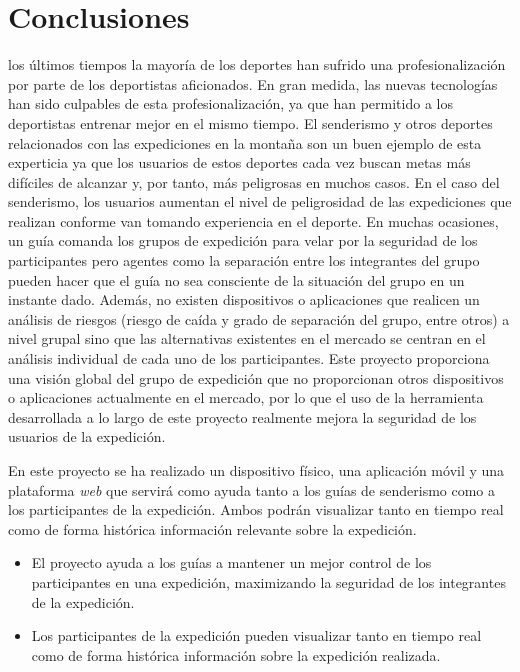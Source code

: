 \chapter{Conclusiones}
\label{chap:conclusiones}

 los últimos tiempos la mayoría de los deportes han sufrido una profesionalización por parte de los deportistas aficionados. En gran medida, las nuevas tecnologías han sido culpables de esta profesionalización, ya que han permitido a los deportistas entrenar mejor en el mismo tiempo. El senderismo y otros deportes relacionados con las expediciones en la montaña son un buen ejemplo de esta experticia ya que los usuarios de estos deportes cada vez buscan metas más difíciles de alcanzar y, por tanto, más peligrosas en muchos casos. En el caso del senderismo, los usuarios aumentan el nivel de peligrosidad de las expediciones que realizan conforme van tomando experiencia en el deporte. En muchas ocasiones, un guía comanda los grupos de expedición para velar por la seguridad de los participantes pero agentes como la separación entre los integrantes del grupo pueden hacer que el guía no sea consciente de la situación del grupo en un instante dado. Además, no existen dispositivos o aplicaciones que realicen un análisis de riesgos (riesgo de caída y grado de separación del grupo, entre otros) a nivel grupal sino que las alternativas existentes en el mercado se centran en el análisis individual de cada uno de los participantes. Este proyecto proporciona una visión global del grupo de expedición que no proporcionan otros dispositivos o aplicaciones actualmente en el mercado, por lo que el uso de la herramienta desarrollada a lo largo de este proyecto realmente mejora la seguridad de los usuarios de la expedición. 

En este proyecto se ha realizado un dispositivo físico, una aplicación móvil y una plataforma \textit{web} que servirá como ayuda tanto a los guías de senderismo como a los participantes de la expedición. Ambos podrán visualizar tanto en tiempo real como de forma histórica información relevante sobre la expedición.

\begin{itemize}
\item El proyecto ayuda a los guías a mantener un mejor control de los participantes en una expedición, maximizando la seguridad de los integrantes de la expedición.
\item Los participantes de la expedición pueden visualizar tanto en tiempo real como de forma histórica información sobre la expedición realizada. 
\end{itemize}

